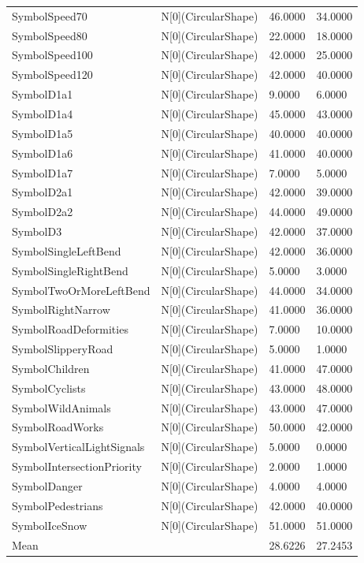 \begin{tabular}{llll}
SymbolSpeed70 & N[0](CircularShape) & 46.0000 & 34.0000 \\
SymbolSpeed80 & N[0](CircularShape) & 22.0000 & 18.0000 \\
SymbolSpeed100 & N[0](CircularShape) & 42.0000 & 25.0000 \\
SymbolSpeed120 & N[0](CircularShape) & 42.0000 & 40.0000 \\
SymbolD1a1 & N[0](CircularShape) & 9.0000 & 6.0000 \\
SymbolD1a4 & N[0](CircularShape) & 45.0000 & 43.0000 \\
SymbolD1a5 & N[0](CircularShape) & 40.0000 & 40.0000 \\
SymbolD1a6 & N[0](CircularShape) & 41.0000 & 40.0000 \\
SymbolD1a7 & N[0](CircularShape) & 7.0000 & 5.0000 \\
SymbolD2a1 & N[0](CircularShape) & 42.0000 & 39.0000 \\
SymbolD2a2 & N[0](CircularShape) & 44.0000 & 49.0000 \\
SymbolD3 & N[0](CircularShape) & 42.0000 & 37.0000 \\
SymbolSingleLeftBend & N[0](CircularShape) & 42.0000 & 36.0000 \\
SymbolSingleRightBend & N[0](CircularShape) & 5.0000 & 3.0000 \\
SymbolTwoOrMoreLeftBend & N[0](CircularShape) & 44.0000 & 34.0000 \\
SymbolRightNarrow & N[0](CircularShape) & 41.0000 & 36.0000 \\
SymbolRoadDeformities & N[0](CircularShape) & 7.0000 & 10.0000 \\
SymbolSlipperyRoad & N[0](CircularShape) & 5.0000 & 1.0000 \\
SymbolChildren & N[0](CircularShape) & 41.0000 & 47.0000 \\
SymbolCyclists & N[0](CircularShape) & 43.0000 & 48.0000 \\
SymbolWildAnimals & N[0](CircularShape) & 43.0000 & 47.0000 \\
SymbolRoadWorks & N[0](CircularShape) & 50.0000 & 42.0000 \\
SymbolVerticalLightSignals & N[0](CircularShape) & 5.0000 & 0.0000 \\
SymbolIntersectionPriority & N[0](CircularShape) & 2.0000 & 1.0000 \\
SymbolDanger & N[0](CircularShape) & 4.0000 & 4.0000 \\
SymbolPedestrians & N[0](CircularShape) & 42.0000 & 40.0000 \\
SymbolIceSnow & N[0](CircularShape) & 51.0000 & 51.0000 \\
Mean &  & 28.6226 & 27.2453 \\
\bottomrule
\end{tabular}
